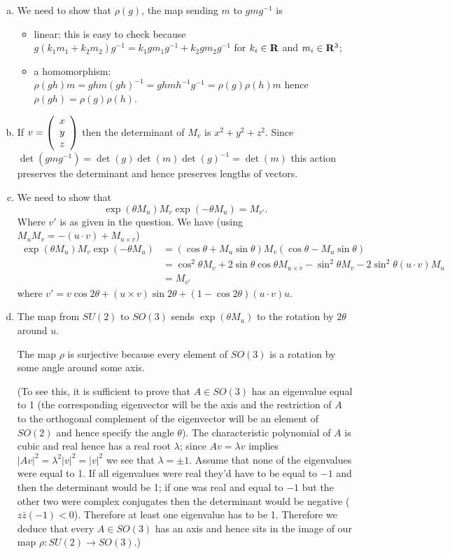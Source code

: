 \documentclass[12pt]{article}
\begin{document}
\iffalse
\begin{answer}
\begin{enumerate}[(a)]
\item We need to show that $\rho(g)$, the map sending $m$ to $gmg^{-1}$ is
\begin{itemize}
\item linear: this is easy to check because $g(k_1m_1+k_2m_2)g^{-1}=k_1gm_1g^{-1}+k_2gm_2g^{-1}$ for $k_i\in\mathbf{R}$ and $m_i\in\mathbf{R}^3$;
\item a homomorphism: $\rho(gh)m=ghm(gh)^{-1}=ghmh^{-1}g^{-1}=\rho(g)\rho(h)m$ hence $\rho(gh)=\rho(g)\rho(h)$.
\end{itemize}
\item If $v=\left(\begin{array}{c}x \\ y \\ z\end{array}\right)$ then the determinant of $M_v$ is $x^2+y^2+z^2$. Since $\det(gmg^{-1})=\det(g)\det(m)\det(g)^{-1}=\det(m)$ this action preserves the determinant and hence preserves lengths of vectors.
\item We need to show that
\[\exp(\theta M_u)M_v\exp(-\theta M_u)=M_{v'}.\]
Where $v'$ is as given in the question. We have (using $M_uM_v=-(u\cdot v)+M_{u\times v}$)
\begin{align*}
\exp(\theta M_u)M_v\exp(-\theta M_u)&=(\cos\theta+M_u\sin\theta)M_v(\cos\theta-M_u\sin\theta)\\
                                   &=\cos^2\theta M_v+2\sin\theta\cos\theta M_{u\times v}-\sin^2\theta M_v-2\sin^2\theta(u\cdot v)M_u\\
                                   &=M_{v'}
\end{align*}
where $v'=v\cos 2\theta+(u\times v)\sin 2\theta +(1-\cos 2\theta)(u\cdot v)u$.
\item The map from $SU(2)$ to $SO(3)$ sends $\exp(\theta M_u)$ to the rotation by $2\theta$ around $u$.

The map $\rho$ is surjective because every element of $SO(3)$ is a rotation by some angle around some axis.

(To see this, it is sufficient to prove that $A\in SO(3)$ has an eigenvalue equal to 1 (the corresponding eigenvector will be the axis and the restriction of $A$ to the orthogonal complement of the eigenvector will be an element of $SO(2)$ and hence specify the angle $\theta$). The characteristic polynomial of $A$ is cubic and real hence has a real root $\lambda$; since $Av=\lambda v$ implies $|Av|^2=\lambda^2|v|^2=|v|^2$ we see that $\lambda=\pm 1$. Assume that none of the eigenvalues were equal to 1. If all eigenvalues were real they'd have to be equal to $-1$ and then the determinant would be 1; if one was real and equal to $-1$ but the other two were complex conjugates then the determinant would be negative ($z\bar{z}(-1)<0$). Therefore at least one eigenvalue has to be 1. Therefore we deduce that every $A\in SO(3)$ has an axis and hence sits in the image of our map $\rho\colon SU(2)\to SO(3)$.)


\end{enumerate}
\end{answer}
\end{document}
